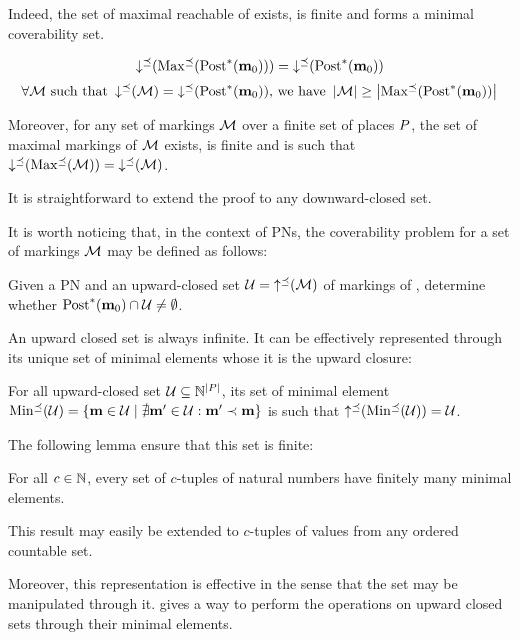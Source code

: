 Indeed, the set of maximal reachable \omarks of \namePN exists, is finite and forms a minimal coverability set.

\[\operatorname{\downarrow^\preceq}(\operatorname{Max^\preceq}(\operatorname{Post}^*_{}(\mathbf{m}_0))) = \operatorname{\downarrow^\preceq}(\operatorname{Post}^*_{}(\mathbf{m}_0))\]
\[\forall \mathcal{M} \text{ such that } \operatorname{\downarrow^\preceq}(\mathcal{M}) = \operatorname{\downarrow^\preceq}(\operatorname{Post}^*_{}(\mathbf{m}_0))\text{, we have } \left|\mathcal{M}\right| \geq \left|\operatorname{Max^\preceq}(\operatorname{Post}^*_{}(\mathbf{m}_0))\right|\]

Moreover, for any set of markings $\mathcal{M}$ over a finite set of places $P$, the set of maximal markings of $\mathcal{M}$ exists, is finite and is such that $\operatorname{\downarrow^\preceq}(\operatorname{Max^\preceq}(\mathcal{M})) = \operatorname{\downarrow^\preceq}(\mathcal{M})$.


It is straightforward to extend the proof to any downward-closed set.

It is worth noticing that, in the context of \acp{PN}, the coverability problem for a set of markings $\mathcal{M}$ may be defined as follows:
\begin{defi}
  \label{defi:upclocovprblm}
  Given a \ac{PN} \namePN and an upward-closed set $\mathcal{U} = \operatorname{\uparrow^\preceq}(\mathcal{M})$ of markings of \namePN, determine whether $\operatorname{Post}^*_{}(\mathbf{m}_0) \cap \mathcal{U} \neq \emptyset$.
\end{defi}

An upward closed set is always infinite.
It can be effectively represented through its unique set of minimal elements whose it is the upward closure:
\begin{lemm}
  For all upward-closed set $\mathcal{U} \subseteq \mathbb{N}^{\left|P\right|}$, its set of minimal element $\operatorname{Min^\preceq}(\mathcal{U}) = \{\mathbf{m} \in \mathcal{U} \mid \nexists \mathbf{m}' \in \mathcal{U} : \mathbf{m}' \prec \mathbf{m}\}$ is such that $\operatorname{\uparrow^\preceq}(\operatorname{Min^\preceq}(\mathcal{U})) = \mathcal{U}$.
\end{lemm}

The following lemma ensure that this set is finite:
\begin{lemm}
  For all $c \in \mathbb{N}$, every set of $c$-tuples of natural numbers have finitely many minimal elements.
\end{lemm}
This result may easily be extended to $c$-tuples of values from any ordered countable set.

Moreover, this representation is effective in the sense that the set may be manipulated through it.
\cite{Ganty09} gives a way to perform the operations on upward closed sets through their minimal elements.

